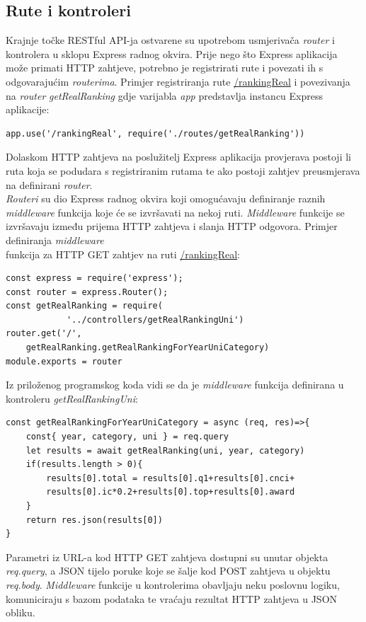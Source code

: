 \documentclass[times, utf8, zavrsni]{fer}
\begin{document}
\subsection{Rute i kontroleri}
Krajnje točke  RESTful API-ja ostvarene su upotrebom usmjerivača \emph{router} i kontrolera u sklopu Express radnog okvira. 
Prije nego što Express aplikacija može primati HTTP zahtjeve, potrebno je registrirati rute i povezati ih s odgovarajućim \emph{routerima}.
Primjer registriranja rute \url{/rankingReal} i povezivanja na \emph{router} \emph{getRealRanking} gdje varijabla \emph{app} predstavlja instancu Express aplikacije:
\begin{verbatim}  
app.use('/rankingReal', require('./routes/getRealRanking'))
\end{verbatim}
Dolaskom HTTP zahtjeva na poslužitelj Express aplikacija provjerava postoji li ruta koja se podudara s registriranim rutama te ako postoji 
zahtjev preusmjerava na definirani \emph{router}.
\\\emph{Routeri} su dio Express radnog okvira koji omogućavaju definiranje raznih \emph{middleware} funkcija koje će se izvršavati 
na nekoj ruti.
\emph{Middleware} funkcije se izvršavaju između prijema HTTP zahtjeva i slanja HTTP odgovora. Primjer definiranja \emph{middleware}
\\funkcija za HTTP GET zahtjev na ruti \url{/rankingReal}:
\begin{verbatim}  
const express = require('express');
const router = express.Router();
const getRealRanking = require(
            '../controllers/getRealRankingUni')
router.get('/', 
    getRealRanking.getRealRankingForYearUniCategory)
module.exports = router
\end{verbatim}
Iz priloženog programskog koda vidi se da je \emph{middleware} funkcija definirana u kontroleru \emph{getRealRankingUni}:
\begin{verbatim}  
const getRealRankingForYearUniCategory = async (req, res)=>{
    const{ year, category, uni } = req.query
    let results = await getRealRanking(uni, year, category)
    if(results.length > 0){
        results[0].total = results[0].q1+results[0].cnci+
        results[0].ic*0.2+results[0].top+results[0].award
    }
    return res.json(results[0])
}
\end{verbatim}
Parametri iz URL-a kod HTTP GET zahtjeva dostupni su unutar objekta \emph{req.query}, a JSON tijelo poruke koje se šalje kod POST zahtjeva u objektu \emph{req.body}.
\emph{Middleware} funkcije u kontrolerima obavljaju neku poslovnu logiku, komuniciraju s bazom podataka te vraćaju rezultat HTTP zahtjeva u JSON obliku.
\end{document}
